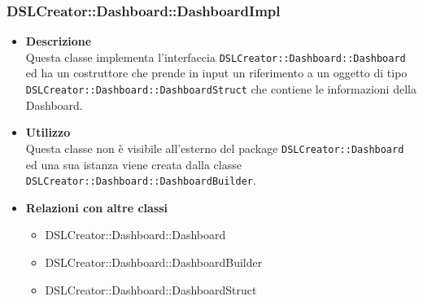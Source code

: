                 \subsubsection{DSLCreator::Dashboard::DashboardImpl}
                    \begin{itemize}
                        \item \textbf{Descrizione} \hfill \\
                            Questa classe implementa l'interfaccia \texttt{DSLCreator::Dashboard::Dashboard} ed ha un costruttore che prende in input un riferimento a un oggetto di tipo \\ \texttt{DSLCreator::Dashboard::DashboardStruct} che contiene le informazioni della Dashboard.
                        \item \textbf{Utilizzo} \hfill \\
                            Questa classe non è visibile all'esterno del package \texttt{DSLCreator::Dashboard} ed una sua istanza viene creata dalla classe \texttt{DSLCreator::Dashboard::DashboardBuilder}.
                        \item \textbf{Relazioni con altre classi}
                            \begin{itemize}
                              \item DSLCreator::Dashboard::Dashboard
                              \item DSLCreator::Dashboard::DashboardBuilder
                              \item DSLCreator::Dashboard::DashboardStruct
                            \end{itemize}
                    \end{itemize}


